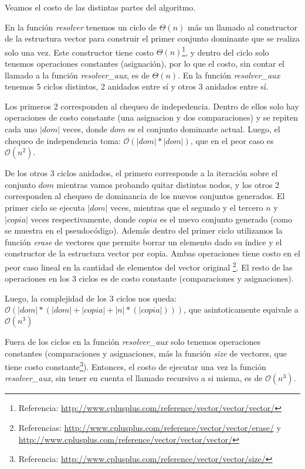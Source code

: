 Veamos el costo de las distintas partes del algoritmo.

En la función \textit{resolver} tenemos un ciclo de $\Theta(n)$ más un llamado al constructor de la estructura vector para construir el primer conjunto dominante que se realiza solo una vez. Este constructor tiene costo $\Theta(n)$\footnote{Referencia: \url{http://www.cplusplus.com/reference/vector/vector/vector/}}, y dentro del ciclo solo tenemos operaciones constantes (asignación), por lo que el costo, sin contar el llamado a la función \textit{resolver_aux}, es de $\Theta(n)$.
En la función \textit{resolver_aux} tenemos 5 ciclos distintos, 2 anidados entre sí y otros 3 anidados entre sí.

Los primeros 2 corresponden al chequeo de indepedencia. Dentro de ellos solo hay operaciones de costo constante (una asignacion y dos comparaciones) y se repiten cada uno $|dom|$ veces, donde $dom$ es el conjunto dominante actual. Luego, el chequeo de independencia toma: $\mathcal{O}(|dom|*|dom|)$, que en el peor caso es $\mathcal{O}(n^2)$.

De los otros 3 ciclos anidados, el primero corresponde a la iteración sobre el conjunto $dom$ mientras vamos probando quitar distintos nodos, y los otros 2 corresponden al chequeo de dominancia de los nuevos conjuntos generados.
El primer ciclo se ejecuta $|dom|$ veces, mientras que el segundo y el tercero $n$ y $|copia|$ veces respectivamente, donde $copia$ es el nuevo conjunto generado (como se muestra en el pseudocódigo). Además dentro del primer ciclo utilizamos la función \textit{erase} de vectores que permite borrar un elemento dado su índice y el constructor de la estructura vector por copia. Ambas operaciones tiene costo en el peor caso lineal en la cantidad de elementos del vector original \footnote{Referencias: \url{http://www.cplusplus.com/reference/vector/vector/erase/} y \url{http://www.cplusplus.com/reference/vector/vector/vector/}}. El resto de las operaciones en los 3 ciclos es de costo constante (comparaciones y asignaciones).

Luego, la complejidad de los 3 ciclos nos queda: $\mathcal{O}(|dom|*(|dom| + |copia| + |n|* (|copia|)))$, que asintoticamente equivale a $\mathcal{O}(n^3)$

Fuera de los ciclos en la función \textit{resolver_aux} solo tenemos operaciones constantes (comparaciones y asignaciones, más la función \textit{size} de vectores, que tiene costo constante\footnote{Referencia: \url{http://www.cplusplus.com/reference/vector/vector/size/}}). Entonces, el costo de ejecutar una vez la función \textit{resolver_aux}, sin tener en cuenta el llamado recursivo a si misma, es de $\mathcal{O}(n^3)$.

